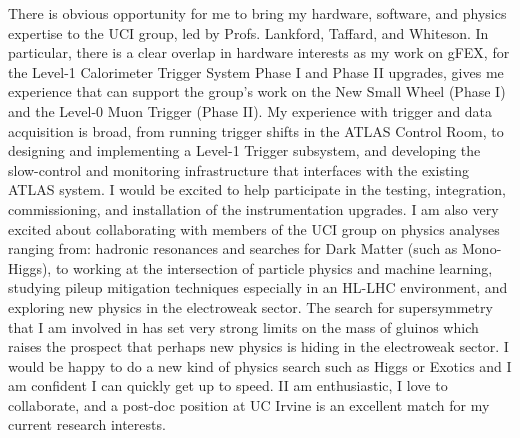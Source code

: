 

There is obvious opportunity for me to bring my hardware, software, and physics expertise to the UCI group, led by Profs. Lankford, Taffard, and Whiteson. In particular, there is a clear overlap in hardware interests as my work on gFEX, for the Level-1 Calorimeter Trigger System Phase I and Phase II upgrades, gives me experience that can support the group's work on the New Small Wheel (Phase I) and the Level-0 Muon Trigger (Phase II). My experience with trigger and data acquisition is broad, from running trigger shifts in the ATLAS Control Room, to designing and implementing a Level-1 Trigger subsystem, and developing the slow-control and monitoring infrastructure that interfaces with the existing ATLAS system. I would be excited to help participate in the testing, integration, commissioning, and installation of the instrumentation upgrades. I am also very excited about collaborating with members of the UCI group on physics analyses ranging from: hadronic resonances and searches for Dark Matter (such as Mono-Higgs), to working at the intersection of particle physics and machine learning, studying pileup mitigation techniques especially in an HL-LHC environment, and exploring new physics in the electroweak sector. The search for supersymmetry that I am involved in has set very strong limits on the mass of gluinos which raises the prospect that perhaps new physics is hiding in the electroweak sector. I would be happy to do a new kind of physics search such as Higgs or Exotics and I am confident I can quickly get up to speed. II am enthusiastic, I love to collaborate, and a post-doc position at UC Irvine is an excellent match for my current research interests.


